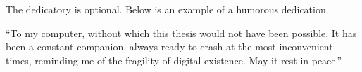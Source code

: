 

\frontmatter %

\pagestyle{plain} %


\maketitlepage


\integritystatement

%
\begin{dedicatory}
	The dedicatory is optional. Below is an example of a humorous dedication.

	``To my computer, without which this thesis would not have been possible. It has been a constant companion, always ready to crash at the most inconvenient times, reminding me of the fragility of digital existence. May it rest in peace.''
\end{dedicatory}


